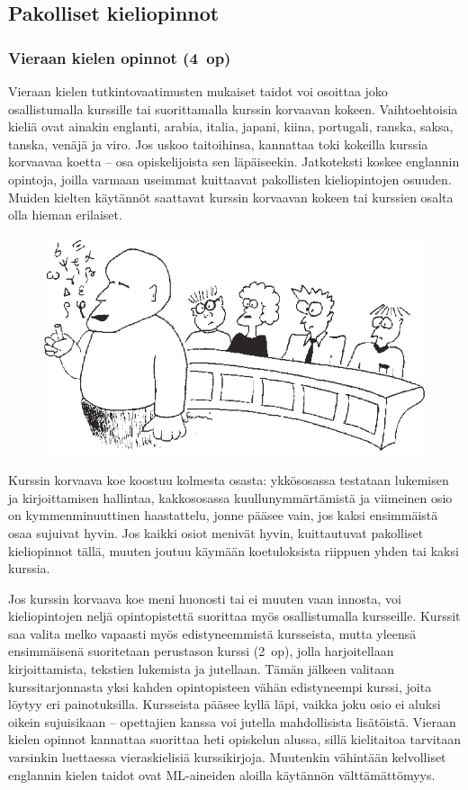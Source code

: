 \documentclass[a5paper, 8pt, twocolumn]{book} %
\numberwithin{equation}{section}
\begin{document}
\subsection*{Pakolliset kieliopinnot}
\subsubsection*{Vieraan kielen opinnot (4~op)}
Vieraan kielen tutkintovaatimusten mukaiset
taidot voi osoittaa joko osallistumalla
kurssille tai suorittamalla kurssin korvaavan
kokeen. Vaihtoehtoisia kieliä ovat
ainakin englanti, arabia, italia, japani, kiina, portugali, ranska, saksa, tanska, venäjä ja viro. Jos uskoo taitoihinsa, kannattaa
toki kokeilla kurssia korvaavaa koetta
-- osa opiskelijoista sen läpäiseekin.
Jatkoteksti koskee englannin opintoja,
joilla varmaan useimmat kuittaavat
pakollisten kieliopintojen osuuden.
Muiden kielten käytännöt saattavat
kurssin korvaavan kokeen tai kurssien
osalta olla hieman erilaiset.
\begin{figure}[!b]
\centering
\includegraphics[width=\textwidth]{kieliluento.png}
\end{figure}
Kurssin korvaava koe koostuu kolmesta
osasta: ykkösosassa testataan lukemisen
ja kirjoittamisen hallintaa, kakkososassa
kuullunymmärtämistä ja viimeinen osio
on kymmenminuuttinen haastattelu, jonne
pääsee vain, jos kaksi ensimmäistä osaa
sujuivat hyvin. Jos kaikki osiot menivät hyvin, kuittautuvat pakolliset kieliopinnot
tällä, muuten joutuu käymään koetuloksista
riippuen yhden tai kaksi kurssia.

Jos kurssin korvaava koe meni huonosti
tai ei muuten vaan innosta, voi kieliopintojen
neljä opintopistettä suorittaa myös
osallistumalla kursseille. Kurssit saa valita
melko vapaasti myös edistyneemmistä
kursseista, mutta yleensä ensimmäisenä
suoritetaan perustason kurssi (2~op), jolla
harjoitellaan kirjoittamista, tekstien lukemista
ja jutellaan. Tämän jälkeen valitaan
kurssitarjonnasta yksi kahden opintopisteen vähän
edistyneempi kurssi, joita löytyy eri
painotuksilla. Kursseista pääsee kyllä läpi,
vaikka joku osio ei aluksi oikein sujuisikaan
-- opettajien kanssa voi jutella mahdollisista
lisätöistä. Vieraan kielen opinnot
kannattaa suorittaa heti opiskelun alussa,
sillä kielitaitoa tarvitaan varsinkin luettaessa
vieraskielisiä kurssikirjoja. Muutenkin
vähintään kelvolliset englannin kielen
taidot ovat ML-aineiden aloilla käytännön
välttämättömyys.
\end{document}
